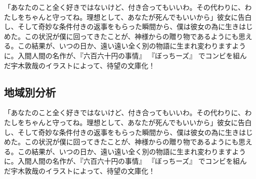「あなたのこと全く好きではないけど、付き合ってもいいわ。その代わりに、わたしをちゃんと守ってね。理想として、あなたが死んでもいいから」彼女に告白し、そして奇妙な条件付きの返事をもらった瞬間から、僕は彼女の為に生きはじめた。この状況が僕に回ってきたことが、神様からの贈り物であるようにも思える。この結果が、いつの日か、遠い遠い全く別の物語に生まれ変わりますように。入間人間の名作が、『六百六十円の事情』 『ぼっちーズ』 でコンビを組んだ宇木敦哉のイラストによって、待望の文庫化！

\subsection{地域別分析}

「あなたのこと全く好きではないけど、付き合ってもいいわ。その代わりに、わたしをちゃんと守ってね。理想として、あなたが死んでもいいから」彼女に告白し、そして奇妙な条件付きの返事をもらった瞬間から、僕は彼女の為に生きはじめた。この状況が僕に回ってきたことが、神様からの贈り物であるようにも思える。この結果が、いつの日か、遠い遠い全く別の物語に生まれ変わりますように。入間人間の名作が、『六百六十円の事情』 『ぼっちーズ』 でコンビを組んだ宇木敦哉のイラストによって、待望の文庫化！

